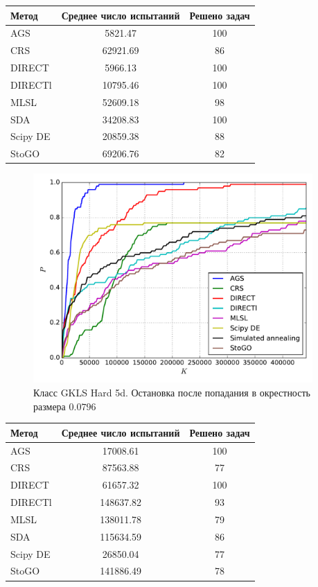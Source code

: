 \documentclass[a4paper]{article}
\begin{document}
\begin{tabular}{lcc}
\hline
 Метод    &  Среднее число испытаний  &  Решено задач  \\
\hline
 AGS      &          5821.47          &      100       \\
 CRS      &         62921.69          &       86       \\
 DIRECT   &          5966.13          &      100       \\
 DIRECTl  &         10795.46          &      100       \\
 MLSL     &         52609.18          &       98       \\
 SDA      &         34208.83          &      100       \\
 Scipy DE &         20859.38          &       88       \\
 StoGO    &         69206.76          &       82       \\
\hline
\end{tabular}
\begin{figure}[H]
  \center
  \includegraphics[width=0.95\textwidth]{../experiments/gklsh5d_serg/cmc.pdf}
  \caption{Класс GKLS Hard 5d. Остановка после попадания в окрестность размера $0.0796$}
  \label{fig:}
\end{figure}

\begin{tabular}{lcc}
\hline
 Метод    &  Среднее число испытаний  &  Решено задач  \\
\hline
 AGS      &         17008.61          &      100       \\
 CRS      &         87563.88          &       77       \\
 DIRECT   &         61657.32          &      100       \\
 DIRECTl  &         148637.82         &       93       \\
 MLSL     &         138011.78         &       79       \\
 SDA      &         115634.59         &       86       \\
 Scipy DE &         26850.04          &       77       \\
 StoGO    &         141886.49         &       78       \\
\hline
\end{tabular}
\end{document}
